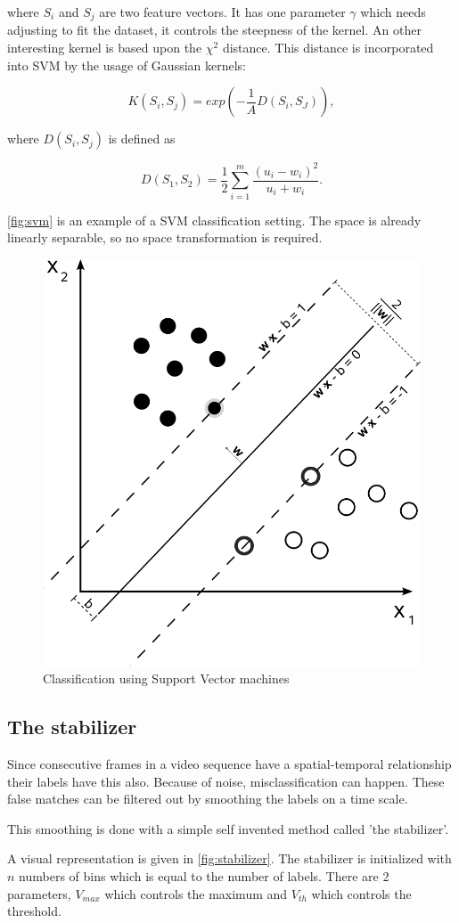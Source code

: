 where $S_i$ and $S_j$ are two feature vectors. It has one parameter $\gamma$ which needs adjusting to fit the dataset, it controls the steepness of the kernel. An other interesting kernel is based upon the $\chi^2$ distance\cite{Zhang2007}. This distance is incorporated into SVM by the usage of Gaussian kernels\cite{Chapelle1999}:

\begin{equation}
	K(S_i,S_j) = exp(-\frac{1}{A}D(S_i,S_J)),
\end{equation}

where $D(S_i,S_j)$ is defined as

\begin{equation}
	D(S_1,S_2) = \frac{1}{2}\sum^{m}_{i=1}\frac{(u_i-w_i)^2}{u_i+w_i}.
\end{equation}

\autoref{fig:svm} is an example of a SVM classification setting. The space is already linearly separable, so no space transformation is required. 

\begin{figure}[htbp]
\center{}
\includegraphics[width=0.3\linewidth]{figures/svm.png}
\caption{Classification using Support Vector machines}
\label{fig:svm}
\end{figure}




\subsection*{The stabilizer}
\label{subsec:stabilizer}
Since consecutive frames in a video sequence have a spatial-temporal relationship their labels have this also. Because of noise, misclassification can happen. These false matches can be filtered out by smoothing the labels on a time scale.

This smoothing is done with a simple self invented method called 'the stabilizer'.

A visual representation is given in \autoref{fig:stabilizer}. The stabilizer is initialized with $n$ numbers of bins which is equal to the number of labels. There are 2 parameters, $V_{max}$ which controls the maximum and $V_{th}$ which controls the threshold.


